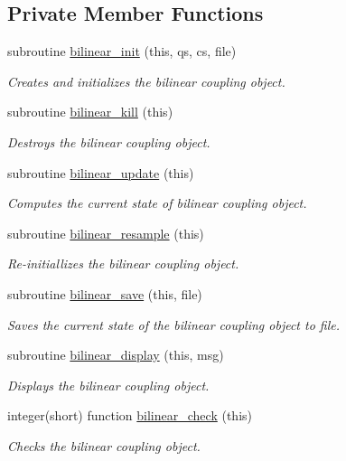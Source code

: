 \subsection*{Private Member Functions}
\begin{DoxyCompactItemize}
\item 
subroutine \hyperlink{classbilinear__class_a767f35cd3ebd5ef00f6a55fd775c3a27}{bilinear\-\_\-init} (this, qs, cs, file)
\begin{DoxyCompactList}\small\item\em Creates and initializes the bilinear coupling object. \end{DoxyCompactList}\item 
subroutine \hyperlink{classbilinear__class_ae206ab58d224c9a0b7e25ac038e003ae}{bilinear\-\_\-kill} (this)
\begin{DoxyCompactList}\small\item\em Destroys the bilinear coupling object. \end{DoxyCompactList}\item 
subroutine \hyperlink{classbilinear__class_a37ead815723c4c247c156200f5bf4721}{bilinear\-\_\-update} (this)
\begin{DoxyCompactList}\small\item\em Computes the current state of bilinear coupling object. \end{DoxyCompactList}\item 
subroutine \hyperlink{classbilinear__class_aac587f5ea6d66ee89ff3210b10569777}{bilinear\-\_\-resample} (this)
\begin{DoxyCompactList}\small\item\em Re-\/initiallizes the bilinear coupling object. \end{DoxyCompactList}\item 
subroutine \hyperlink{classbilinear__class_a5fe875f5d4db31ef7a7e721ba4a0146a}{bilinear\-\_\-save} (this, file)
\begin{DoxyCompactList}\small\item\em Saves the current state of the bilinear coupling object to file. \end{DoxyCompactList}\item 
subroutine \hyperlink{classbilinear__class_a4346246df7738e0d609716d961a3b94c}{bilinear\-\_\-display} (this, msg)
\begin{DoxyCompactList}\small\item\em Displays the bilinear coupling object. \end{DoxyCompactList}\item 
integer(short) function \hyperlink{classbilinear__class_ab2484d90163983597fb17b15e480e675}{bilinear\-\_\-check} (this)
\begin{DoxyCompactList}\small\item\em Checks the bilinear coupling object. \end{DoxyCompactList}\end{DoxyCompactItemize}


